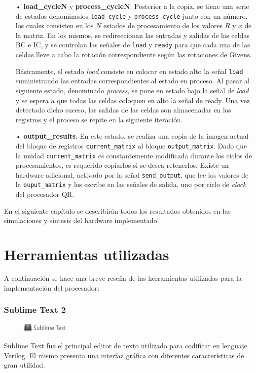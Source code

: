 \begin{itemize}
	
	\item[•] \textbf{load\_cycleN} y \textbf{process\_cycleN}: Posterior a la copia, se tiene una serie de estados denominados \verb;load_cycle; y \verb;process_cycle; junto con un número, los cuales consisten en los $N$ estados de procesamiento de los valores $R$ y $x$ de la matriz. En los mismos, se redireccionan las entradas y salidas de las celdas BC e IC, y se controlan las señales de \verb;load; y \verb;ready; para que cada una de las celdas lleve a cabo la rotación correspondiente según las rotaciones de Givens.
	
	Básicamente, el estado \textit{load} consiste en colocar en estado alto la señal \verb;load; suministrando las entradas correspondientes al estado en proceso. Al pasar al siguiente estado, denominado \textit{process}, se pone en estado bajo la señal de \textit{load} y se espera a que todas las celdas coloquen en alto la señal de ready. Una vez detectado dicho suceso, las salidas de las celdas son almacenadas en los registros y el proceso se repite en la siguiente iteración.
	
	\item[•] \textbf{output\_results}: En este estado, se realiza una copia de la imagen actual del bloque de registros \verb;current_matrix; al bloque \verb;output_matrix;. Dado que la unidad \verb;current_matrix; es constantemente modificada durante los ciclos de procesamientos, es requerido copiarlos si se desea retenerlos. Existe un hardware adicional, activado por la señal \verb;send_output;, que lee los valores de la \verb;ouput_matrix; y los escribe en las señales de salida, uno por ciclo de \textit{clock} del procesador QR.
\end{itemize}

En el siguiente capítulo se describirán todos los resultados obtenidos en las simulaciones y síntesis del hardware implementado.

\section{Herramientas utilizadas}

A continuación se hace una breve reseña de las herramientas utilizadas para la implementación del procesador:

\subsubsection*{Sublime Text 2}
\begin{figure}
	\vspace{-15pt}
	\begin{center}
		\includegraphics[width=0.20\textwidth]{./figures/C04-logo_sublime}
	\end{center}
	\vspace{-15pt}
\end{figure}
Sublime Text fue el principal editor de texto utilizado para codificar en lenguaje Verilog. El mismo presenta una interfaz gráfica con diferentes características de gran utilidad.

